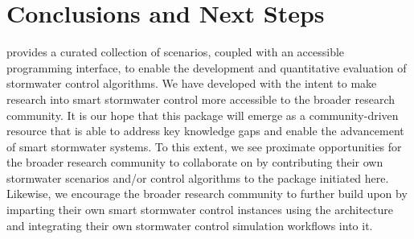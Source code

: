 \section{Conclusions and Next Steps}
\label{sec:conclusion}
%
%
%
\pystorms provides a curated collection of scenarios, coupled with an accessible programming interface, to enable the development and quantitative evaluation of stormwater control algorithms. We have developed \pystorms with the intent to make research into smart stormwater control more accessible to the broader research community. It is our hope that this package will emerge as a community-driven resource that is able to address key knowledge gaps and enable the advancement of smart stormwater systems. To this extent, we see proximate opportunities for the broader research community to collaborate on \pystorms by contributing their own stormwater scenarios and/or control algorithms to the package initiated here. Likewise, we encourage the broader research community to further build upon \pystorms by imparting their own smart stormwater control instances using the \pystorms architecture and integrating their own stormwater control simulation workflows into it.

